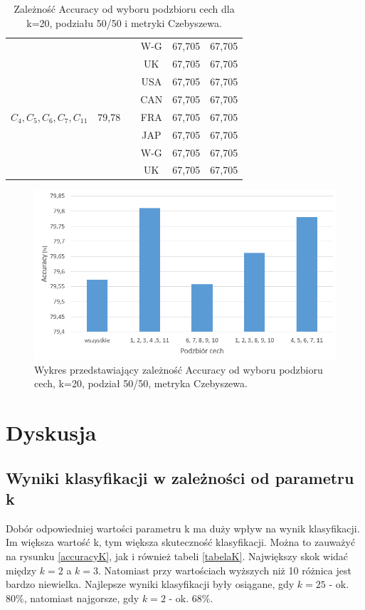 \documentclass{classrep}
\begin{document}
\begin{table}[h!]
\begin{tabular} {c c c c c c}
		&												&\vline& W-G & 67,705 & 67,705 \\
		&		 										&\vline& UK  & 67,705 & 67,705 \\
		\hline 
		&   										&\vline& USA & 67,705 & 67,705 \\
		&											&\vline& CAN & 67,705 & 67,705 \\
		$C_4, C_5, C_6, C_7, C_{11}$ & 79,78        &\vline& FRA & 67,705 & 67,705 \\
		&											&\vline& JAP & 67,705 & 67,705 \\
		&											&\vline& W-G & 67,705 & 67,705 \\
		&		 									&\vline& UK  & 67,705 & 67,705 \\
		\hline 
		\hline
	\end{tabular}
	\caption{Zależność Accuracy od wyboru podzbioru cech dla k=20, podziału 50/50 i metryki Czebyszewa. }
	\label{tabelaFeatures}
\end{table}

\begin{figure}[h!]
    \centering
    \includegraphics[width=1\textwidth]{accuracyFeatures.png}
    \caption{Wykres przedstawiający zależność Accuracy od wyboru podzbioru cech, k=20, podział 50/50, metryka Czebyszewa.}
    \label{accuracyFeatures}
\end{figure}

\newpage
\section{Dyskusja} %
\subsection{Wyniki klasyfikacji w zależności od parametru k}
Dobór odpowiedniej wartości parametru k ma duży wpływ na wynik klasyfikacji. Im większa wartość k, tym większa skuteczność klasyfikacji. Można to zauważyć na rysunku \ref{accuracyK}, jak i również tabeli \ref{tabelaK}. Największy skok widać między $k=2$ a $k=3$. Natomiast przy wartościach wyższych niż 10 różnica jest bardzo niewielka. Najlepsze wyniki klasyfikacji były osiągane, gdy $k=25$ - ok. 80\%, natomiast najgorsze, gdy $k=2$ - ok. 68\%. 
\end{document}
